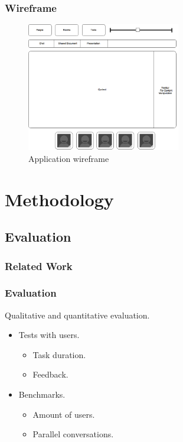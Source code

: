 \documentclass[compress]{beamer}
\begin{document}
\begin{frame}[c]
		\frametitle{Wireframe}
		\begin{figure}[H]
			\includegraphics[width=0.6\textwidth]{figures/pbf.png}
			\caption{Application wireframe}
		\end{figure}
	\end{frame}

\section{Methodology}\label{meth} %
\subsection{Evaluation}
\begin{frame}[t,shrink]
\frametitle{Related Work} 
\end{frame}
\begin{frame}[c]
		\frametitle{Evaluation}
Qualitative and quantitative evaluation.

		\begin{itemize}
		\item Tests with users.
		
			\begin{itemize}
			\item Task duration.
			\item Feedback.
			\end{itemize}
		\item Benchmarks.
			\begin{itemize}
			\item Amount of users.
			\item Parallel conversations.
			\end{itemize}
		
		\end{itemize}
	\end{frame}
\end{document}
